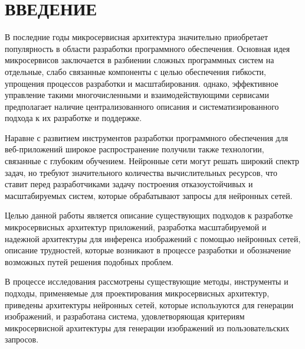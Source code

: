 \chapter*{\large ВВЕДЕНИЕ}  
В последние годы микросервисная архитектура значительно приобретает популярность в области разработки программного обеспечения.
Основная идея микросервисов заключается в разбиении сложных программных систем на отдельные,
слабо связанные компоненты с целью обеспечения гибкости, упрощения процессов разработки и масштабирования.
однако, эффективное управление такими многочисленными и взаимодействующими сервисами предполагает 
наличие централизованного описания и систематизированного подхода к их разработке и поддержке.

Наравне с развитием инструментов разработки программного обеспечения для веб-приложений 
широкое распространение получили также технологии, связанные с глубоким обучением. Нейронные сети могут решать широкий спектр
задач, но требуют значительного количества вычислительных ресурсов, что ставит перед разработчиками задачу построения
отказоустойчивых и масштабируемых систем, которые обрабатывают запросы для нейронных сетей.

Целью данной работы является описание существующих подходов к разработке микросервисных архитектур приложений, разработка 
масштабируемой и надежной архитектуры для инференса изображений с помощью нейронных сетей, описание трудностей, которые
возникают в процессе разработки и обозначение возможных путей решения подобных проблем.

В процессе исследования рассмотрены существующие методы, инструменты и подходы,
применяемые для проектирования микросервисных архитектур, приведены архитектуры нейронных сетей, которые используются для генерации
изображений, и разработана система, удовлетворяющая критериям микросервисной
архитектуры для генерации изображений из пользовательских запросов.

